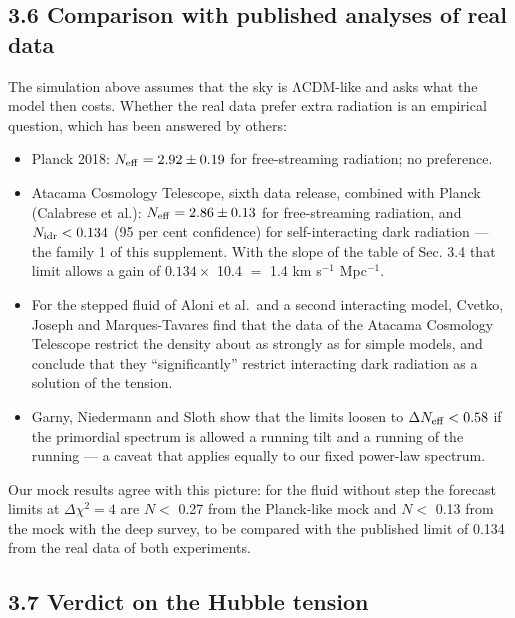 \documentclass[
  10pt,
]{article}
\providecommand{\tightlist}{%
  \setlength{\itemsep}{0pt}\setlength{\parskip}{0pt}}
\begin{document}
\hypertarget{comparison-with-published-analyses-of-real-data}{%
\subsection{3.6 Comparison with published analyses of real
data}\label{comparison-with-published-analyses-of-real-data}}

The simulation above assumes that the sky is ΛCDM-like and asks what the
model then costs. Whether the real data prefer extra radiation is an
empirical question, which has been answered by others:

\begin{itemize}
\tightlist
\item
  Planck 2018: \(N_{\rm eff}=2.92\pm0.19\) for free-streaming radiation;
  no preference.
\item
  Atacama Cosmology Telescope, sixth data release, combined with Planck
  (Calabrese et al.): \(N_{\rm eff}=2.86\pm0.13\) for free-streaming
  radiation, and \(N_{\rm idr}<0.134\) (95 per cent confidence) for
  self-interacting dark radiation --- the family 1 of this supplement.
  With the slope of the table of Sec. 3.4 that limit allows a gain of
  \(0.134\times\) 10.4 \(=\) 1.4 km s\(^{-1}\) Mpc\(^{-1}\).
\item
  For the stepped fluid of Aloni et al.~and a second interacting model,
  Cvetko, Joseph and Marques-Tavares find that the data of the Atacama
  Cosmology Telescope restrict the density about as strongly as for
  simple models, and conclude that they ``significantly'' restrict
  interacting dark radiation as a solution of the tension.
\item
  Garny, Niedermann and Sloth show that the limits loosen to
  \(\Delta N_{\rm eff}<0.58\) if the primordial spectrum is allowed a
  running tilt and a running of the running --- a caveat that applies
  equally to our fixed power-law spectrum.
\end{itemize}

Our mock results agree with this picture: for the fluid without step the
forecast limits at \(\Delta\chi^2=4\) are \(N<\) 0.27 from the
Planck-like mock and \(N<\) 0.13 from the mock with the deep survey, to
be compared with the published limit of 0.134 from the real data of both
experiments.

\hypertarget{verdict-on-the-hubble-tension}{%
\subsection{3.7 Verdict on the Hubble
tension}\label{verdict-on-the-hubble-tension}}
\end{document}
